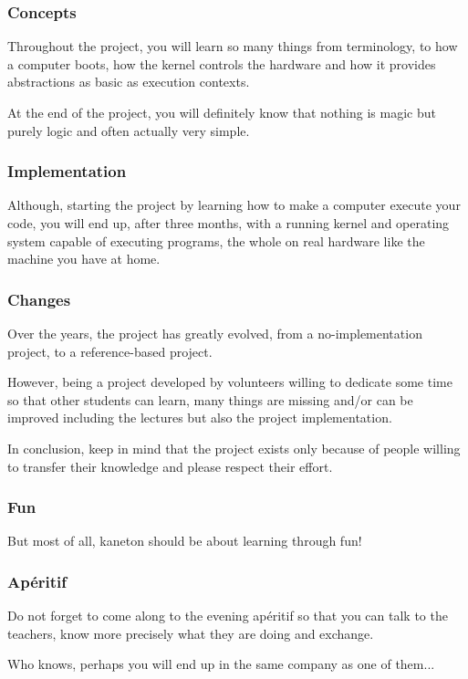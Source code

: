 \begin{frame}
  \frametitle{Concepts}

  Throughout the project, you will learn so many things from terminology,
  to how a computer boots, how the kernel controls the hardware and how it
  provides abstractions as basic as execution contexts.

  \-

  At the end of the project, you will definitely know that nothing is magic
  but purely logic and often actually very simple.
\end{frame}


\begin{frame}
  \frametitle{Implementation}

  Although, starting the project by learning how to make a computer execute
  your code, you will end up, after three months, with a running kernel
  and operating system capable of executing programs, the whole on real
  hardware like the machine you have at home.
\end{frame}


\begin{frame}
  \frametitle{Changes}

  Over the years, the project has greatly evolved, from a no-implementation
  project, to a reference-based project.

  \-

  However, being a project developed by volunteers willing to dedicate some
  time so that other students can learn, many things are missing and/or
  can be improved including the lectures but also the project implementation.

  \-

  In conclusion, keep in mind that the project exists only because of people
  willing to transfer their knowledge and please respect their effort.
\end{frame}


\begin{frame}
  \frametitle{Fun}

  But most of all, kaneton should be about learning through fun!
\end{frame}


\begin{frame}
  \frametitle{Ap\'eritif}

  Do not forget to come along to the evening ap\'eritif so that you can
  talk to the teachers, know more precisely what they are doing and
  exchange.

  \-

  Who knows, perhaps you will end up in the same company as one of them...
\end{frame}

